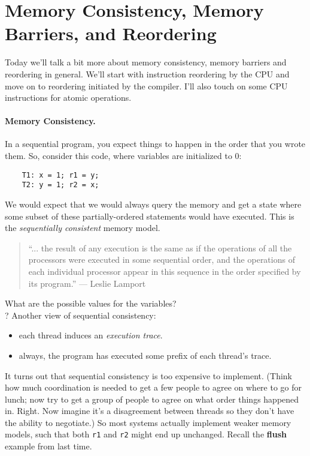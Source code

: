 




\section*{Memory Consistency, Memory Barriers, and Reordering}
Today we'll talk a bit more about memory consistency, memory barriers
and reordering in general. We'll start with instruction reordering by
the CPU and move on to reordering initiated by the compiler.  I'll
also touch on some CPU instructions for atomic operations.

\paragraph{Memory Consistency.} In a sequential program, you expect
things to happen in the order that you wrote them. So, consider this code,
where variables are initialized to 0:

\begin{center}
\begin{verbatim}
    T1: x = 1; r1 = y;
    T2: y = 1; r2 = x;
\end{verbatim}
\end{center}
We would expect that we would always query the memory and get a state
where some subset of these partially-ordered statements would have executed.
This is the \emph{sequentially consistent} memory model.

\begin{quote}
``... the result of any execution is the same as if the operations of all the processors were executed in some sequential order, and the operations of each individual processor appear in this sequence in the order specified by its program.'' --- Leslie Lamport
\end{quote}

{\sf What are the possible values for the variables?}\\[3em]
?
Another view of sequential consistency:
\begin{itemize}
      \item each thread induces an \emph{execution trace}.
      \item always, the program has executed some prefix of each thread's
        trace.
\end{itemize}


It turns out that sequential consistency is too expensive to implement.
(Think how much coordination is needed to get a few people to agree on where to go for lunch; now try to get a group of people to agree on what order things happened in. Right. Now imagine it's a disagreement between threads so they don't have the ability to negotiate.) So most systems actually implement weaker memory models,
such that both {\tt r1} and {\tt r2} might end up unchanged. Recall the 
{\bf flush} example from last time.

